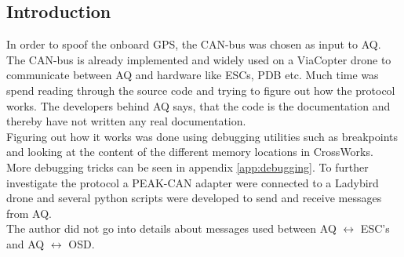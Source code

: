 \subsection{Introduction}
In order to spoof the onboard GPS, the CAN-bus was chosen as input to AQ. 
The CAN-bus is already implemented and widely used on a ViaCopter drone to communicate between AQ and hardware like ESCs, PDB etc. Much time was spend reading through the source code and trying to figure out how the protocol works.
The developers behind AQ says, that the code is the documentation and thereby have not written any real documentation. \\
Figuring out how it works was done using debugging utilities such as breakpoints and looking at the content of the different memory locations in CrossWorks.\\
More debugging tricks can be seen in appendix \ref{app:debugging}. 
To further investigate the protocol a PEAK-CAN adapter were connected to a Ladybird drone and several python scripts were developed to send and receive messages from AQ. \\
The author did not go into details about messages used between AQ $\leftrightarrow$ ESC's and AQ $\leftrightarrow$ OSD.\\

